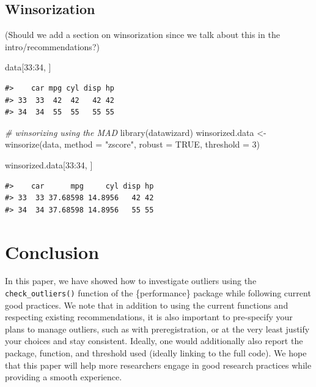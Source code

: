 \documentclass[
]{article}
\newenvironment{Shaded}{\begin{snugshade}}{\end{snugshade}}
\newcommand{\AttributeTok}[1]{\textcolor[rgb]{0.77,0.63,0.00}{#1}}
\newcommand{\CommentTok}[1]{\textcolor[rgb]{0.56,0.35,0.01}{\textit{#1}}}
\newcommand{\ConstantTok}[1]{\textcolor[rgb]{0.00,0.00,0.00}{#1}}
\newcommand{\DecValTok}[1]{\textcolor[rgb]{0.00,0.00,0.81}{#1}}
\newcommand{\FunctionTok}[1]{\textcolor[rgb]{0.00,0.00,0.00}{#1}}
\newcommand{\NormalTok}[1]{#1}
\newcommand{\OtherTok}[1]{\textcolor[rgb]{0.56,0.35,0.01}{#1}}
\newcommand{\SpecialCharTok}[1]{\textcolor[rgb]{0.00,0.00,0.00}{#1}}
\newcommand{\StringTok}[1]{\textcolor[rgb]{0.31,0.60,0.02}{#1}}
\begin{document}
\hypertarget{winsorization}{%
\subsection{Winsorization}\label{winsorization}}

(Should we add a section on winsorization since we talk about this in
the intro/recommendations?)

\begin{Shaded}
\begin{Highlighting}[]
\NormalTok{data[}\DecValTok{33}\SpecialCharTok{:}\DecValTok{34}\NormalTok{, ]}
\end{Highlighting}
\end{Shaded}

\begin{verbatim}
#>    car mpg cyl disp hp
#> 33  33  42  42   42 42
#> 34  34  55  55   55 55
\end{verbatim}

\begin{Shaded}
\begin{Highlighting}[]
\CommentTok{\# winsorizing using the MAD}
\FunctionTok{library}\NormalTok{(datawizard)}
\NormalTok{winsorized.data }\OtherTok{\textless{}{-}} \FunctionTok{winsorize}\NormalTok{(data, }\AttributeTok{method =} \StringTok{"zscore"}\NormalTok{, }\AttributeTok{robust =} \ConstantTok{TRUE}\NormalTok{, }\AttributeTok{threshold =} \DecValTok{3}\NormalTok{)}

\NormalTok{winsorized.data[}\DecValTok{33}\SpecialCharTok{:}\DecValTok{34}\NormalTok{, ]}
\end{Highlighting}
\end{Shaded}

\begin{verbatim}
#>    car      mpg     cyl disp hp
#> 33  33 37.68598 14.8956   42 42
#> 34  34 37.68598 14.8956   55 55
\end{verbatim}

\hypertarget{conclusion}{%
\section{Conclusion}\label{conclusion}}

In this paper, we have showed how to investigate outliers using the
\texttt{check\_outliers()} function of the \{performance\} package while
following current good practices. We note that in addition to using the
current functions and respecting existing recommendations, it is also
important to pre-specify your plans to manage outliers, such as with
preregistration, or at the very least justify your choices and stay
consistent. Ideally, one would additionally also report the package,
function, and threshold used (ideally linking to the full code). We hope
that this paper will help more researchers engage in good research
practices while providing a smooth experience.
\end{document}
